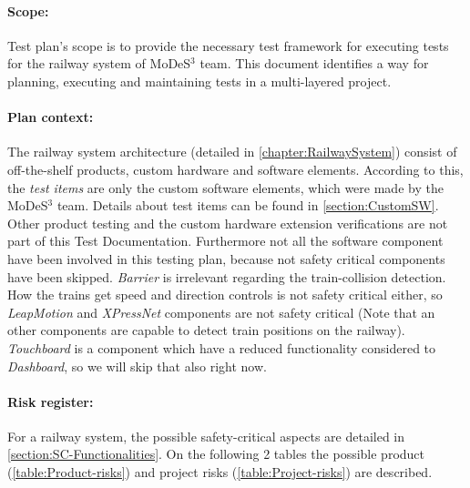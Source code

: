 \paragraph{Scope:} Test plan's scope is to provide the necessary test framework for executing tests for the railway system of MoDeS$^3$ team. This document identifies a way for planning, executing and maintaining tests in a multi-layered project.
\paragraph{Plan context:} The railway system architecture (detailed in \autoref{chapter:RailwaySystem}) consist of off-the-shelf products, custom hardware and software elements. According to this, the \textit{test items} are only the custom software elements, which were made by the MoDeS$^3$ team. Details about test items can be found in \autoref{section:CustomSW}. Other product testing and the custom hardware extension verifications are not part of this Test Documentation. Furthermore not all the software component have been involved in this testing plan, because not safety critical components have been skipped. \textit{Barrier} is irrelevant regarding the train-collision detection. How the trains get speed and direction controls is not safety critical either, so \textit{LeapMotion} and \textit{XPressNet} components are not safety critical (Note that an other components are capable to detect train positions on the railway). \textit{Touchboard} is a component which have a reduced functionality considered to \textit{Dashboard}, so we will skip that also right now.
\paragraph{Risk register:}
For a railway system, the possible safety-critical aspects are detailed in \autoref{section:SC-Functionalities}. On the following 2 tables the possible product (\autoref{table:Product-risks}) and project risks (\autoref{table:Project-risks}) are described.

